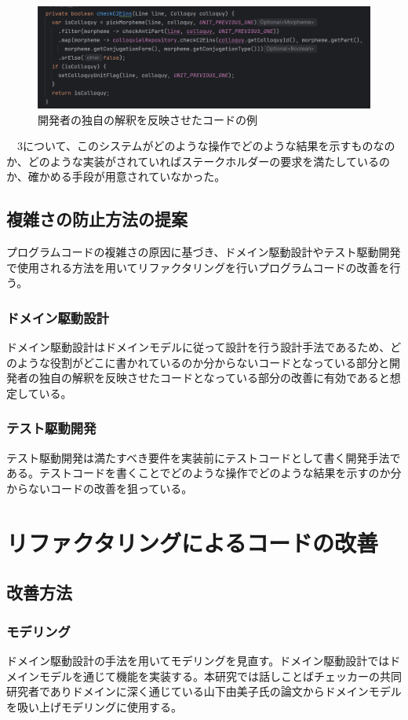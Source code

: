\documentclass[11pt, a4paper]{jreport}
\begin{document}
\begin{figure}[H]
\centering
\includegraphics[width=1\linewidth]{image/geini2.png}
\caption{開発者の独自の解釈を反映させたコードの例}
\label{fig:enter-label}
\end{figure}
　3について、このシステムがどのような操作でどのような結果を示すものなのか、どのような実装がされていればステークホルダーの要求を満たしているのか、確かめる手段が用意されていなかった。
\section{複雑さの防止方法の提案}
プログラムコードの複雑さの原因に基づき、ドメイン駆動設計やテスト駆動開発で使用される方法を用いてリファクタリングを行いプログラムコードの改善を行う。
\subsection{ドメイン駆動設計}
ドメイン駆動設計はドメインモデルに従って設計を行う設計手法であるため、どのような役割がどこに書かれているのか分からないコードとなっている部分と開発者の独自の解釈を反映させたコードとなっている部分の改善に有効であると想定している。
\subsection{テスト駆動開発}
テスト駆動開発は満たすべき要件を実装前にテストコードとして書く開発手法である。テストコードを書くことでどのような操作でどのような結果を示すのか分からないコードの改善を狙っている。
\chapter{リファクタリングによるコードの改善}
\section{改善方法}
\subsection{モデリング}
ドメイン駆動設計の手法を用いてモデリングを見直す。ドメイン駆動設計ではドメインモデルを通じて機能を実装する。本研究では話しことばチェッカーの共同研究者でありドメインに深く通じている山下由美子氏の論文からドメインモデルを吸い上げモデリングに使用する。
\end{document}
